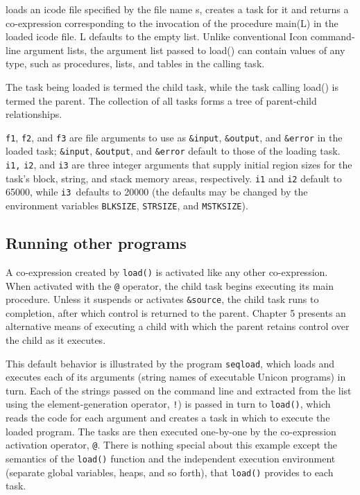 \noindent loads an icode file \cite{Gris86} specified by the file name
\textrm{s}, creates a task for it and returns a co-expression corresponding to
the invocation of the procedure {\textrm{main(L)}} in the
loaded icode file.  {\textrm{L}}{
}defaults to the empty list. Unlike conventional Icon command-line argument
lists, the argument list passed to{
}{\textrm{load()}} can contain values of any type, such as
procedures, lists, and tables in the calling task.

The task being loaded is termed the child task, while the task calling
{\textrm{load()}} is termed the parent. The
collection of all tasks forms a tree of parent-child
relationships.

{\texttt{f1}}, {\texttt{f2}},
and {\texttt{f3}}{ }are file
arguments to use as {\texttt{\&input}},
{\texttt{\&output}}, and
{\texttt{\&error}} in the loaded task;
{\texttt{\&input}},
{\texttt{\&output}}, and
{\texttt{\&error}}{\textrm{
}}default to those of the loading task.{\textrm{
}}{\texttt{i1,}} {\texttt{i2}},
and {\texttt{i3}} are three integer arguments that
supply initial region sizes for the task's block,
string, and stack memory areas, respectively.
{\texttt{i1}} and {\texttt{i2}}
default to 65000, while {\texttt{i3 }}defaults to
20000 (the defaults may be changed by the environment variables
{\texttt{BLKSIZE}},
{\texttt{STRSIZ}}\texttt{E}, and
{\texttt{MSTKSIZE}}). 

\subsection*{Running other programs}

A co-expression created by {\texttt{load()}} is
activated like any other co-expression. When activated with the
{\texttt{@}} operator, the child task begins
executing its main procedure. Unless it suspends or activates
{\texttt{\&source}}, the child task runs to
completion, after which control is returned to the parent. Chapter 5
presents an alternative means of executing a child with which the
parent retains control over the child as it executes. 

This default behavior is illustrated by the program
\texttt{seqload}, which loads and executes each
of its arguments (string names of executable Unicon programs) in turn.
Each of the strings passed on the command line and extracted from the
list using the element-generation operator,
{\texttt{!}}) is passed in turn to
{\texttt{load()}}, which reads the code for each argument
and creates a task in which to execute the loaded program. The tasks
are then executed one-by-one by the co-expression activation operator,
{\texttt{@}}. There is
nothing special about this example except the semantics of the
{\texttt{load()}} function and the independent
execution environment (separate global variables, heaps, and so forth),
that {\texttt{load()}} provides to each task. 

